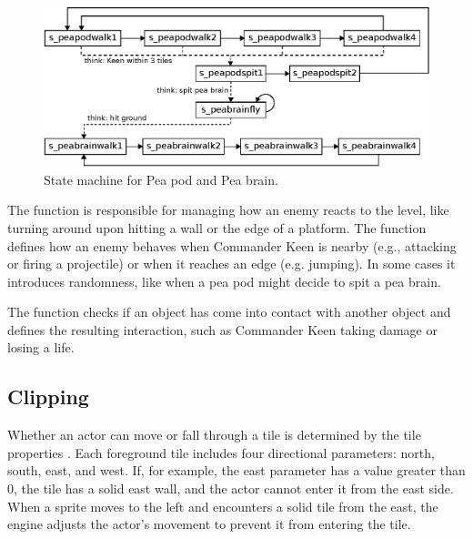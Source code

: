 \documentclass[book.tex]{subfiles}
\begin{document}
\begin{figure}[H]
  \centering
  \includegraphics[width=\textwidth]{imgs/drawings/state_machine.eps}
  \caption{State machine for Pea pod and Pea brain.}
  \label{fig:state_machine}  
\end{figure}

\par
The  function is responsible for managing how an enemy reacts to the level, like turning around upon hitting a wall or the edge of a platform. The  function defines how an enemy behaves when Commander Keen is nearby (e.g., attacking or firing a projectile) or when it reaches an edge (e.g. jumping). In some cases it introduces randomness, like when a pea pod might decide to spit a pea brain.\\

\par
\begin{minipage}{\textwidth}
  
\end{minipage}
\label{state_type}

\par
The  function checks if an object has come into contact with another object and defines the resulting interaction, such as Commander Keen taking damage or losing a life.



\subsection{Clipping}
\label{section:clipping}
Whether an actor can move or fall through a tile is determined by the tile properties . Each foreground tile includes four directional parameters: north, south, east, and west. If, for example, the east parameter has a value greater than 0, the tile has a solid east wall, and the actor cannot enter it from the east side. When a sprite moves to the left and encounters a solid tile from the east, the engine adjusts the actor's movement to prevent it from entering the tile.\\
\end{document}
